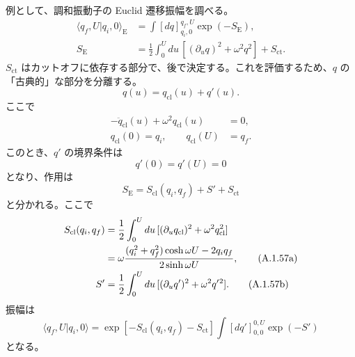 
例として、調和振動子の Euclid 遷移振幅を調べる。
\begin{align}
\langle q_f,U|q_i,0\rangle_{\mathrm E}
&=\int[dq]_{q_i,0}^{q_f,U}\exp(-S_{\mathrm E}),
\tag{A.1.52a}\label{eq:A.1.52a}\\
S_{\mathrm E}
&=\frac12\int_0^Udu\,[(\partial_uq)^2+\omega^2q^2]+S_{\mathrm{ct}}.
\tag{A.1.52b}\label{eq:A.1.52b}
\end{align}
$S_{\mathrm{ct}}$ はカットオフに依存する部分で、後で決定する。これを評価するため、$q$ の「古典的」な部分を分離する。
\begin{equation}
q(u)=q_{\mathrm{cl}}(u)+q'(u).
\tag{A.1.53}\label{eq:A.1.53}
\end{equation}
ここで
\begin{align}
-\ddot q_{\mathrm{cl}}(u)+\omega^2q_{\mathrm{cl}}(u)&=0,
\tag{A.1.54a}\label{eq:A.1.54a}\\
q_{\mathrm{cl}}(0)=q_i,\qquad q_{\mathrm{cl}}(U)&=q_f.
\tag{A.1.54b}\label{eq:A.1.54b}
\end{align}
このとき、$q'$ の境界条件は
\begin{equation}
q'(0)=q'(U)=0
\tag{A.1.55}\label{eq:A.1.55}
\end{equation}
となり、作用は
\begin{equation}
S_{\mathrm E}=S_{\mathrm{cl}}(q_i,q_f)+S'+S_{\mathrm{ct}}
\tag{A.1.56}\label{eq:A.1.56}
\end{equation}
と分かれる。ここで
\begin{align}
S_{\mathrm{cl}}(q_i,q_f)
&=\frac12\int_0^Udu\,[(\partial_uq_{\mathrm{cl}})^2+\omega^2q_{\mathrm{cl}}^2]
\notag\\
&=\omega\frac{(q_i^2+q_f^2)\cosh\omega U-2q_iq_f}{2\sinh\omega U},
\tag{A.1.57a}\label{eq:A.1.57a}\\
S'&=\frac12\int_0^Udu\,[(\partial_uq')^2+\omega^2q'{}^2].
\tag{A.1.57b}\label{eq:A.1.57b}
\end{align}
振幅は
\begin{equation}
\langle q_f,U|q_i,0\rangle
=\exp[-S_{\mathrm{cl}}(q_i,q_f)-S_{\mathrm{ct}}]
\int[dq']_{0,0}^{0,U}\exp(-S')
\tag{A.1.58}\label{eq:A.1.58}
\end{equation}
となる。

